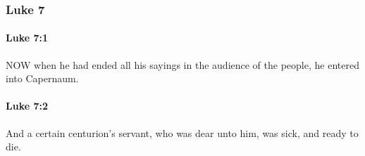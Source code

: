 	\subsubsection{Luke 7} %
		\label{LUKE-7}
		
		\paragraph{Luke 7:1} %
			\label{LUKE-7-1}

			NOW when he had ended all his sayings in the audience of the people, he entered into Capernaum.

			\begin{framed}
			\scriptsize
				\begin{compactdesc}
					\item[SBLG] 
				\end{compactdesc}
			\end{framed}

		\paragraph{Luke 7:2} %
			\label{LUKE-7-2}

			And a certain centurion's servant, who was dear unto him, was sick, and ready to die.

